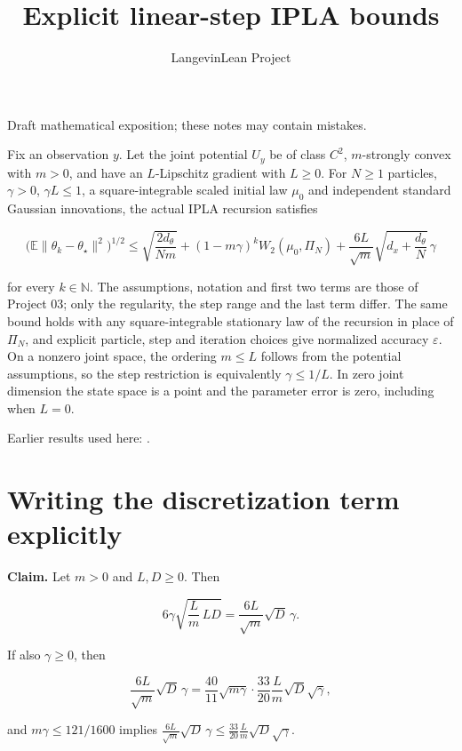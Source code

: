 \documentclass[11pt,a4paper]{article}
\title{\texorpdfstring{Explicit linear-step IPLA bounds}{Explicit linear-step IPLA bounds}}
\author{LangevinLean Project}
\date{}
\begin{document}
\maketitle
Draft mathematical exposition; these notes may contain mistakes.


Fix an observation \(y\). Let the joint potential \(U_y\) be of class \(C^2\), \(m\)-strongly convex with \(m>0\), and have an \(L\)-Lipschitz gradient with \(L\ge0\). For \(N\ge1\) particles, \(\gamma>0\), \(\gamma L\le1\), a square-integrable scaled initial law \(\mu_0\) and independent standard Gaussian innovations, the actual IPLA recursion satisfies

\[\bigl(\mathbb E\|\theta_k-\theta_\star\|^2\bigr)^{1/2}\le\sqrt{\frac{2d_\theta}{Nm}}+(1-m\gamma)^kW_2(\mu_0,\Pi_N)+\frac{6L}{\sqrt m}\sqrt{d_x+\frac{d_\theta}N}\,\gamma\]

for every \(k\in\mathbb N\). The assumptions, notation and first two terms are those of Project 03; only the regularity, the step range and the last term differ. The same bound holds with any square-integrable stationary law of the recursion in place of \(\Pi_N\), and explicit particle, step and iteration choices give normalized accuracy \(\varepsilon\). On a nonzero joint space, the ordering \(m\le L\) follows from the potential assumptions, so the step restriction is equivalently \(\gamma\le1/L\). In zero joint dimension the state space is a point and the parameter error is zero, including when \(L=0\).



Earlier results used here: \cite[Section~3.18]{LangevinLean2026IPLA}.

\section{\texorpdfstring{Writing the discretization term explicitly}{Writing the discretization term explicitly}}


\textbf{Claim.} Let \(m>0\) and \(L,D\ge0\). Then

\[6\gamma\sqrt{\frac Lm\,LD}=\frac{6L}{\sqrt m}\sqrt D\,\gamma.\]

If also \(\gamma\ge0\), then

\[\frac{6L}{\sqrt m}\sqrt D\,\gamma=\frac{40}{11}\sqrt{m\gamma}\cdot\frac{33}{20}\frac Lm\sqrt D\sqrt\gamma,\]

and \(m\gamma\le121/1600\) implies \(\frac{6L}{\sqrt m}\sqrt D\,\gamma\le\frac{33}{20}\frac Lm\sqrt D\sqrt\gamma\).
\end{document}
